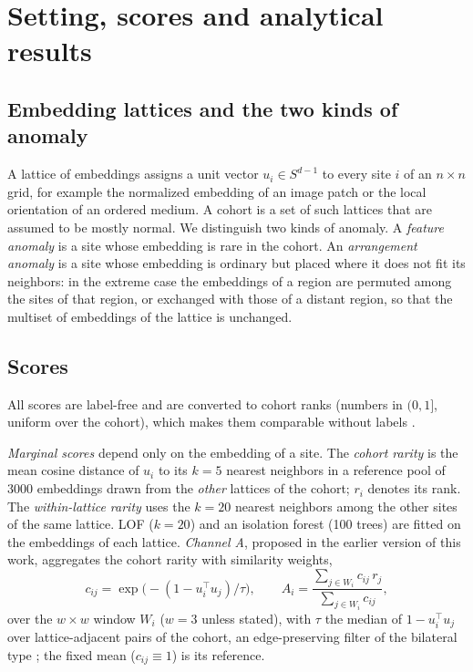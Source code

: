 \section{Setting, scores and analytical results}
\label{sec:theory}

\subsection{Embedding lattices and the two kinds of anomaly}
A lattice of embeddings assigns a unit vector $u_i\in S^{d-1}$ to every site $i$ of an $n\times n$ grid, for example the normalized embedding of an image patch or the local orientation of an ordered medium. A cohort is a set of such lattices that are assumed to be mostly normal. We distinguish two kinds of anomaly. A \emph{feature anomaly} is a site whose embedding is rare in the cohort. An \emph{arrangement anomaly} is a site whose embedding is ordinary but placed where it does not fit its neighbors: in the extreme case the embeddings of a region are permuted among the sites of that region, or exchanged with those of a distant region, so that the multiset of embeddings of the lattice is unchanged.

\subsection{Scores}
All scores are label-free and are converted to cohort ranks (numbers in $(0,1]$, uniform over the cohort), which makes them comparable without labels \citep{Kriegel2011}.

\emph{Marginal scores} depend only on the embedding of a site. The \emph{cohort rarity} is the mean cosine distance of $u_i$ to its $k=5$ nearest neighbors in a reference pool of 3000 embeddings drawn from the \emph{other} lattices of the cohort; $r_i$ denotes its rank. The \emph{within-lattice rarity} uses the $k=20$ nearest neighbors among the other sites of the same lattice. LOF ($k=20$) \citep{Breunig2000} and an isolation forest (100 trees) \citep{Liu2008} are fitted on the embeddings of each lattice. \emph{Channel A}, proposed in the earlier version of this work, aggregates the cohort rarity with similarity weights,
\begin{equation}
c_{ij}=\exp\!\bigl(-(1-u_i^{\top}u_j)/\tau\bigr),\qquad A_i=\frac{\sum_{j\in W_i}c_{ij}\,r_j}{\sum_{j\in W_i}c_{ij}},
\label{eq:simw}
\end{equation}
over the $w\times w$ window $W_i$ ($w=3$ unless stated), with $\tau$ the median of $1-u_i^{\top}u_j$ over lattice-adjacent pairs of the cohort, an edge-preserving filter of the bilateral type \citep{Tomasi1998}; the fixed mean ($c_{ij}\equiv1$) is its reference.

